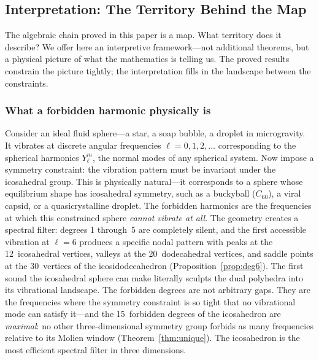\documentclass[11pt,letterpaper]{article}
\theoremstyle{definition}
\begin{document}
\subsection{Interpretation: The Territory Behind the Map}\label{sec:interpretation}
The algebraic chain proved in this paper is a map.  What territory does it describe?  We offer here an interpretive framework---not additional theorems, but a physical picture of what the mathematics is telling us.  The proved results constrain the picture tightly; the interpretation fills in the landscape between the constraints.
\subsubsection*{What a forbidden harmonic physically is}
Consider an ideal fluid sphere---a star, a soap bubble, a droplet in microgravity.  It vibrates at discrete angular frequencies $\ell=0,1,2,\ldots$ corresponding to the spherical harmonics $Y_\ell^m$, the normal modes of any spherical system.  Now impose a symmetry constraint: the vibration pattern must be invariant under the icosahedral group.  This is physically natural---it corresponds to a sphere whose equilibrium shape has icosahedral symmetry, such as a buckyball ($C_{60}$), a viral capsid, or a quasicrystalline droplet.
The forbidden harmonics are the frequencies at which this constrained sphere \emph{cannot vibrate at all}.  The geometry creates a spectral filter: degrees 1 through~5 are completely silent, and the first accessible vibration at $\ell=6$ produces a specific nodal pattern with peaks at the 12~icosahedral vertices, valleys at the 20~dodecahedral vertices, and saddle points at the 30~vertices of the icosidodecahedron (Proposition~\ref{prop:deg6}).  The first sound the icosahedral sphere can make literally sculpts the dual polyhedra into its vibrational landscape.
The forbidden degrees are not arbitrary gaps.  They are the frequencies where the symmetry constraint is so tight that no vibrational mode can satisfy it---and the 15~forbidden degrees of the icosahedron are \emph{maximal}: no other three-dimensional symmetry group forbids as many frequencies relative to its Molien window (Theorem~\ref{thm:unique}).  The icosahedron is the most efficient spectral filter in three dimensions.
\end{document}
